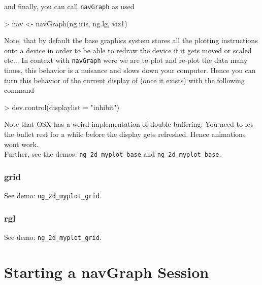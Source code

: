 \documentclass[12pt,oneside,titlepage,letter]{article}
\newcommand{\modify}[1]{{\color{blue}#1}}
\begin{document}
and finally, you can call \texttt{navGraph} as used
\begin{Schunk}
\begin{Sinput}
> nav <- navGraph(ng.iris, ng.lg, viz1)
\end{Sinput}
\end{Schunk}
Note, that by default the base graphics system stores all the plotting instructions onto a device in order to be able to redraw the device if it gets moved or scaled etc... In context with \texttt{navGraph} were we are to plot and re-plot the data many times, this behavior is a nuisance and slows down your computer. Hence you can turn this behavior of the current display of (once it exists) with the following command
\begin{Schunk}
\begin{Sinput}
> dev.control(displaylist = "inhibit")
\end{Sinput}
\end{Schunk}

\modify{Note that OSX has a weird implementation of double buffering. You need to let the bullet rest for a while before the display gets refreshed. Hence animations wont work}.\\

Further, see the demos: \texttt{ng\_2d\_myplot\_base} and \texttt{ng\_2d\_myplot\_base}. 

\subsubsection{grid}
See demo: \texttt{ng\_2d\_myplot\_grid}.
\subsubsection{rgl}
See demo: \texttt{ng\_2d\_myplot\_grid}.


\section{Starting a navGraph Session}
\newcommand{\ngwindow}{
\fill [fill=gray!40] (0,0) rectangle (\ww,-0.2);
\fill [fill=brown!10] (0,-0.2) rectangle (\ww,-0.4);
\draw (0,0) rectangle (\ww,-\wh);
\draw (0,-0.2) -- (\ww,-0.2);
\draw (0,-0.4) -- (\ww,-0.4);
}

\newcommand{\nggraph}[9]{
  \begin{scope}[shift= {(2,-3.6/2-0.4)}]
    \node at ( 1, 0)  [#1, label=right:{\scriptsize A:B}] (AB) {};
    \node at ( 0, -1) [#2, label=below:{\scriptsize A:D}] (AD) {};
    \node at (-1, 0)  [#3, label=left:{\scriptsize B:C}] (BC) {};
    \node at ( 0, 1)  [#4, label=above:{\scriptsize C:D}] (CD) {};
    \draw[#5] (AB) -- (AD);
    \draw[#6] (AB) -- (BC);
    \draw[#7] (AB) -- (CD);
    \draw[#8] (AD) -- (BC);
    \draw[#9] (AD) -- (CD);
  \end{scope}
}
\end{document}
